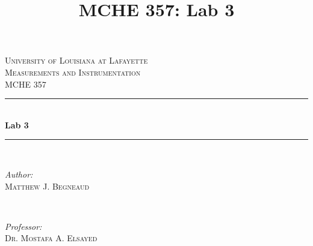 \documentclass[12pt]{article}
\title{MCHE 357: Lab 3}
\begin{document}




\begin{titlepage}

\newcommand{\HRule}{\rule{\linewidth}{0.5mm}} %

\center %
 

\textsc{\LARGE University of Louisiana at Lafayette}\\[1.5cm] %
\textsc{\Large Measurements and Instrumentation}\\[0.5cm] %
\textsc{\large MCHE 357}\\[0.5cm] %


\HRule \\[0.4cm]
{ \huge \bfseries Lab 3}\\[0.4cm] %
\HRule \\[1.5cm]
 

\begin{minipage}{0.4\textwidth}
\begin{flushleft} \large
\emph{Author:}\\
\textsc{Matthew J. Begneaud} \\%
\end{flushleft}
\end{minipage}
~
\begin{minipage}{0.4\textwidth}
\begin{flushright} \large
\emph{Professor:} \\
\textsc{Dr. Mostafa A. Elsayed} %
\end{flushright}
\end{minipage}\\[1.5cm]


\end{titlepage}
\end{document}
